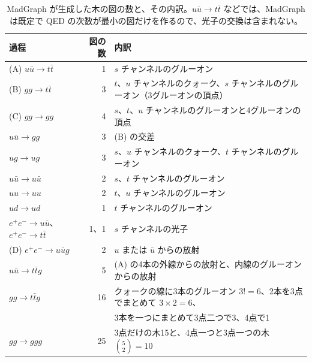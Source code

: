 \documentclass[a4paper,10pt]{ltjsarticle}
\begin{document}
\begin{table}[tbp]
\centering\small
\caption{MadGraph が生成した木の図の数と、その内訳。$u\bar u\to t\bar t$ などでは、MadGraph は既定で QED の次数が最小の図だけを作るので、光子の交換は含まれない。}
\label{tab:diagrams}
\begin{tabular}{lrl}
\toprule
過程 & 図の数 & 内訳 \\
\midrule
(A) $u\bar u\to t\bar t$ & 1 & $s$ チャンネルのグルーオン \\
(B) $gg\to t\bar t$ & 3 & $t$、$u$ チャンネルのクォーク、$s$ チャンネルのグルーオン（3グルーオンの頂点） \\
(C) $gg\to gg$ & 4 & $s$、$t$、$u$ チャンネルのグルーオンと4グルーオンの頂点 \\
$u\bar u\to gg$ & 3 & (B) の交差 \\
$ug\to ug$ & 3 & $s$、$u$ チャンネルのクォーク、$t$ チャンネルのグルーオン \\
$u\bar u\to u\bar u$ & 2 & $s$、$t$ チャンネルのグルーオン \\
$uu\to uu$ & 2 & $t$、$u$ チャンネルのグルーオン \\
$ud\to ud$ & 1 & $t$ チャンネルのグルーオン \\
$e^+e^-\to u\bar u$、$e^+e^-\to t\bar t$ & 1、1 & $s$ チャンネルの光子 \\
(D) $e^+e^-\to u\bar ug$ & 2 & $u$ または $\bar u$ からの放射 \\
$u\bar u\to t\bar tg$ & 5 & (A) の4本の外線からの放射と、内線のグルーオンからの放射 \\
$gg\to t\bar tg$ & 16 & クォークの線に3本のグルーオン $3!=6$、2本を3点でまとめて $3\times2=6$、\\
 & & 3本を一つにまとめて3点二つで3、4点で1 \\
$gg\to ggg$ & 25 & 3点だけの木15と、4点一つと3点一つの木 $\binom52=10$ \\
\bottomrule
\end{tabular}
\end{table}
\end{document}
